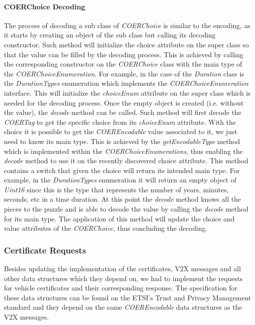 \paragraph{COERChoice Decoding}
The process of decoding a sub class of \textit{COERChoice} is similar to the encoding, as it starts by creating an object of the sub class but calling its decoding constructor. Such method will initialize the choice attribute on the super class so that the value can be filled by the decoding process. This is achieved by calling the corresponding constructor on the \textit{COERChoice} class with the main type of the \textit{COERChoiceEnumeration}. For example, in the case of the \textit{Duration} class is the \textit{DurationTypes} enumeration which implements the \textit{COERChoiceEnumeration} interface. This will initialize the \textit{choiceEnum} attribute on the super class which is needed for the decoding process. Once the empty object is created (i.e. without the value), the \textit{decode} method can be called. Such method will first decode the \textit{COERTag} to get the specific choice from its \textit{choiceEnum} attribute. With the choice it is possible to get the \textit{COEREncodable} value associated to it, we just need to know its main type. This is achieved by the \textit{getEncodableType} method which is implemented within the \textit{COERChoiceEnumerations}, thus enabling the \textit{decode} method to use it on the recently discovered choice attribute. This method contains a switch that given the choice will return its intended main type. For example, in the \textit{DurationTypes} enumeration it will return an empty object of \textit{Uint16} since this is the type that represents the number of years, minutes, seconds, etc in a time duration. At this point the \textit{decode} method knows all the pieces to the puzzle and is able to decode the value by calling the \textit{decode} method for its main type. The application of this method will update the choice and value attributes of the \textit{COERChoice}, thus concluding the decoding. 


\subsubsection{Certificate Requests} \label{requests}
Besides updating the implementation of the certificates, V2X messages and all other data structures which they depend on, we had to implement the requests for vehicle certificates and their corresponding response. The specification for these data structures can be found on the ETSI's Trust and Privacy Management standard \cite{etsi_privacy} and they depend on the same \textit{COEREncodable} data structures as the V2X messages. 


